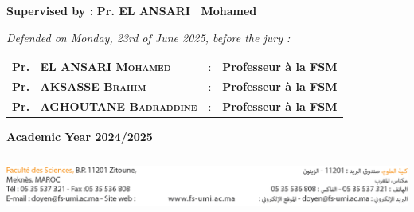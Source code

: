 \documentclass[a4paper,12pt]{report}
\begin{document}
\begin{titlepage}
\begin{center}
\begin{flushleft}
        \end{flushleft}
        \begin{flushleft}
              \textbf{Supervised by :} \hspace{1cm} \textbf{Pr. \textsc{EL ANSARI } ~Mohamed} \hspace{2cm}
            \end{flushleft}

    \begin{flushleft}
         {\large \textit{Defended on Monday, 23rd of June 2025, before the jury : }}\\[0.5cm]
    \end{flushleft}

    \begin{tabular}{lll}
        \bf \textbf{Pr. ~EL ANSARI \textsc{Mohamed}}&  :&\bf \large Professeur à la FSM
        \\[0.1cm]
        \bf \textbf{Pr. ~AKSASSE \textsc{Brahim}}&  :&\bf \large Professeur à la FSM
        \\[0.1cm]
        \bf \textbf{Pr. ~AGHOUTANE \textsc{Badraddine} }&  :&\bf \large Professeur à la FSM
        \vspace{1cm}
   \end{tabular}

    \bf \large{Academic Year 2024/2025 } \\[3.2cm]

        \begin{minipage}{17cm}
    	\begin{center}
    		\includegraphics[width=17cm,height=2cm]{Pics/FooterUMI.png}
    	\end{center}
    \end{minipage}

    \end{center}
\end{titlepage}
\end{document}
